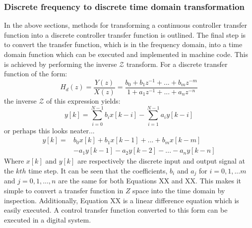 \subsubsection{Discrete frequency to discrete time domain transformation}
In the above sections, methods for transforming a continuous controller transfer function into a discrete controller transfer function is outlined. The final step is to convert the transfer function, which is in the frequency domain, into a time domain function which can be executed and implemented in machine code. This is achieved by performing the inverse $\mathcal{Z}$ transform. For a discrete transfer function of the form:
\begin{equation}
    H_d(z) = \frac{Y(z)}{X(z)} = \frac{b_0 + b_1z^{-1} + ... + b_mz^{-m}}{1 + a_1z^{-1} + ... + a_nz^{-n}}
\end{equation}
the inverse $\mathcal{Z}$ of this expression yields:
\begin{equation}
    y[k] = \sum\limits_{i=0}^{N-1}b_ix[k-i] - \sum\limits_{i=1}^{N-1}a_iy[k-i]
\end{equation}
or perhaps this looks neater...
\begin{align}
y[k] =& b_0x[k] + b_1x[k-1] +  ... + b_mx[k-m] \\
&- a_1y[k-1] - a_2y[k-2] -  ... - a_ny[k-n]
\end{align}
Where $x[k]$ and $y[k]$ are respectively the discrete input and output signal at the $kth$ time step. It can be seen that the coefficients, $b_i$ and $a_j$ for $i= 0, 1, ... m$ and $j=0, 1, ..., n$ are the same for both Equations XX and XX. This makes it simple to convert a transfer function in $Z$ space into the time domain by inspection. Additionally, Equation XX is a linear difference equation which is easily executed. A control transfer function converted to this form can be executed in a digital system.  
